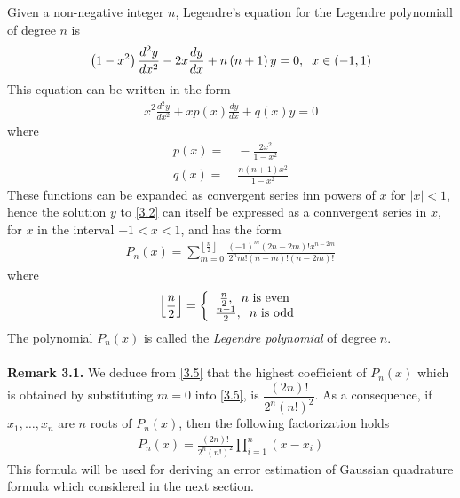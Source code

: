 \documentclass[a4paper]{article}
\numberwithin{equation}{section}
\begin{document}
Given a non-negative integer $n$, Legendre's equation for the Legendre polynomiall of degree $n$ is
\begin{align}
\left( {1 - {x^2}} \right)\frac{{{d^2}y}}{{d{x^2}}} - 2x\frac{{dy}}{{dx}} + n\left( {n + 1} \right)y = 0,\hspace{0.2cm} x \in \left( { - 1,1} \right)
\end{align}
This equation can be written in the form
\begin{align}
\label{3.2}
{x^2}\frac{{{d^2}y}}{{d{x^2}}} + xp\left( x \right)\frac{{dy}}{{dx}} + q\left( x \right)y = 0
\end{align}
where
\begin{align}
p\left( x \right) =&\  - \frac{{2{x^2}}}{{1 - {x^2}}}\\
q\left( x \right) =&\ \frac{{n\left( {n + 1} \right){x^2}}}{{1 - {x^2}}}
\end{align}
These functions can be expanded as convergent series inn powers of $x$ for $\left| x \right| < 1$, hence the solution $y$ to \eqref{3.2} can itself be expressed as a connvergent series in $x$, for $x$ in the interval $-1<x<1$, and has the form
\begin{align}
\label{3.5}
{P_n}\left( x \right) = \sum\limits_{m = 0}^{\left\lfloor {\frac{n}{2}} \right\rfloor } {\frac{{{{\left( { - 1} \right)}^m}\left( {2n - 2m} \right)!{x^{n - 2m}}}}{{{2^n}m!\left( {n - m} \right)!\left( {n - 2m} \right)!}}} 
\end{align}
where 
\begin{align}
\left\lfloor {\frac{n}{2}} \right\rfloor  = \left\{ {\begin{array}{*{20}{c}}
{\frac{n}{2},\hspace{0.2cm} n\mbox{ is even}}\\
{\frac{{n - 1}}{2},\hspace{0.2cm}n\mbox{ is odd}}
\end{array}} \right.
\end{align}
The polynomial $P_n\left(x\right)$ is called the \textit{Legendre polynomial} of degree $n$.\\
\\
\textbf{Remark 3.1.} We deduce from \eqref{3.5} that the highest coefficient of $P_n\left(x\right)$ which is obtained by substituting $m=0$ into \eqref{3.5}, is $\dfrac{{\left( {2n} \right)!}}{{{2^n}{{\left( {n!} \right)}^2}}}$. As a consequence, if $x_1,\ldots,x_n$ are $n$ roots of $P_n\left(x\right)$, then the following factorization holds
\begin{align}
\label{3.7}
{P_n}\left( x \right) = \frac{{\left( {2n} \right)!}}{{{2^n}{{\left( {n!} \right)}^2}}}\prod\limits_{i = 1}^n {\left( {x - {x_i}} \right)} 
\end{align}
This formula will be used for deriving an error estimation of Gaussian quadrature formula which considered in the next section.
\end{document}
